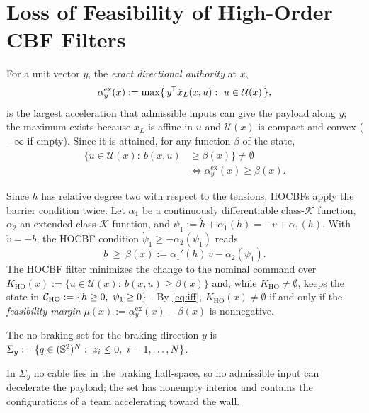\section{Loss of Feasibility of High-Order CBF Filters}\label{sec:negative}

For a unit vector $y$, the \emph{exact directional authority} at $x$,
\begin{equation}
\alpha^{\mathrm{ex}}_y(x):=\max\{\,y^{\!\top}\ddot x_L(x,u):\ u\in\mathcal{U}(x)\,\},
\label{eq:exact}
\end{equation}
is the largest acceleration that admissible inputs can give the payload along $y$; the maximum exists because $\ddot x_L$ is affine in $u$ and $\mathcal{U}(x)$ is compact and convex ($-\infty$ if empty). Since it is attained, for any function $\beta$ of the state,
\begin{align}
\{u\in\mathcal{U}(x):\ b(x,u)&\ge\beta(x)\}\ne\emptyset\label{eq:iff}\\
&\iff\alpha^{\mathrm{ex}}_y(x)\ge\beta(x).\nonumber
\end{align}

Since $h$ has relative degree two with respect to the tensions, HOCBFs \cite{xiao2019control,nguyen2016exponential} apply the barrier condition twice. Let $\alpha_1$ be a continuously differentiable class-$\mathcal{K}$ function, $\alpha_2$ an extended class-$\mathcal{K}$ function, and $\psi_1:=\dot h+\alpha_1(h)=-v+\alpha_1(h)$. With $\dot v=-b$, the HOCBF condition $\dot\psi_1\ge-\alpha_2(\psi_1)$ reads
\begin{equation}
b\ \ge\ \beta(x):=\alpha_1'(h)\,v-\alpha_2(\psi_1).
\label{eq:hocbf}
\end{equation}
The HOCBF filter minimizes the change to the nominal command over $K_{\mathrm{HO}}(x):=\{u\in\mathcal{U}(x):\ b(x,u)\ge\beta(x)\}$ and, while $K_{\mathrm{HO}}\ne\emptyset$, keeps the state in $\mathcal{C}_{\mathrm{HO}}:=\{h\ge 0,\ \psi_1\ge 0\}$ \cite{xiao2022high}. By \eqref{eq:iff}, $K_{\mathrm{HO}}(x)\ne\emptyset$ if and only if the \emph{feasibility margin} $\mu(x):=\alpha^{\mathrm{ex}}_{y}(x)-\beta(x)$ is nonnegative.

\begin{definition}\label{def:free}
The no-braking set for the braking direction $y$ is $\Sigma_y:=\{q\in(\Sph)^N:\ z_i\le 0,\ i=1,\dots,N\}$.
\end{definition}

In $\Sigma_y$ no cable lies in the braking half-space, so no admissible input can decelerate the payload; the set has nonempty interior and contains the configurations of a team accelerating toward the wall.

